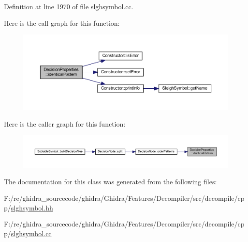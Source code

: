 Definition at line 1970 of file slghsymbol.\+cc.

Here is the call graph for this function\+:
\nopagebreak
\begin{figure}[H]
\begin{center}
\leavevmode
\includegraphics[width=350pt]{class_decision_properties_a49167e9686ae2506f357100d50848e40_cgraph}
\end{center}
\end{figure}
Here is the caller graph for this function\+:
\nopagebreak
\begin{figure}[H]
\begin{center}
\leavevmode
\includegraphics[width=350pt]{class_decision_properties_a49167e9686ae2506f357100d50848e40_icgraph}
\end{center}
\end{figure}


The documentation for this class was generated from the following files\+:\begin{DoxyCompactItemize}
\item 
F\+:/re/ghidra\+\_\+sourcecode/ghidra/\+Ghidra/\+Features/\+Decompiler/src/decompile/cpp/\mbox{\hyperlink{slghsymbol_8hh}{slghsymbol.\+hh}}\item 
F\+:/re/ghidra\+\_\+sourcecode/ghidra/\+Ghidra/\+Features/\+Decompiler/src/decompile/cpp/\mbox{\hyperlink{slghsymbol_8cc}{slghsymbol.\+cc}}\end{DoxyCompactItemize}

